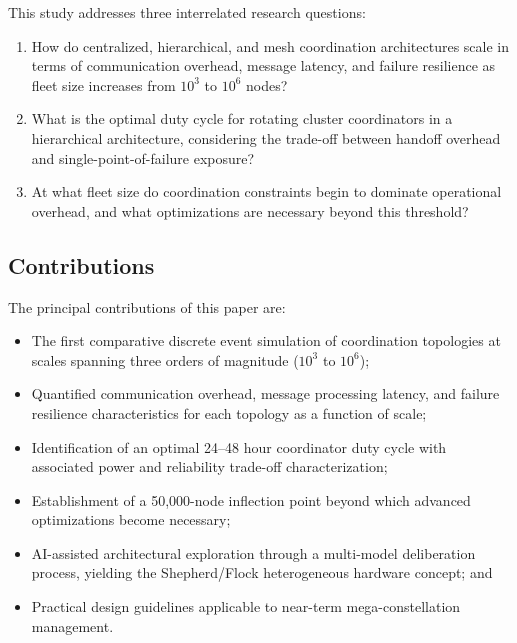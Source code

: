 \documentclass[journal]{IEEEtran}
\begin{document}
This study addresses three interrelated research questions:

\begin{enumerate}
    \item[\textbf{RQ1:}] How do centralized, hierarchical, and mesh coordination architectures scale in terms of communication overhead, message latency, and failure resilience as fleet size increases from $10^3$ to $10^6$ nodes?
    \item[\textbf{RQ2:}] What is the optimal duty cycle for rotating cluster coordinators in a hierarchical architecture, considering the trade-off between handoff overhead and single-point-of-failure exposure?
    \item[\textbf{RQ3:}] At what fleet size do coordination constraints begin to dominate operational overhead, and what optimizations are necessary beyond this threshold?
\end{enumerate}

\subsection{Contributions}

The principal contributions of this paper are:
\begin{itemize}
    \item The first comparative discrete event simulation of coordination topologies at scales spanning three orders of magnitude ($10^3$ to $10^6$);
    \item Quantified communication overhead, message processing latency, and failure resilience characteristics for each topology as a function of scale;
    \item Identification of an optimal 24--48 hour coordinator duty cycle with associated power and reliability trade-off characterization;
    \item Establishment of a 50{,}000-node inflection point beyond which advanced optimizations become necessary;
    \item AI-assisted architectural exploration through a multi-model deliberation process, yielding the Shepherd/Flock heterogeneous hardware concept; and
    \item Practical design guidelines applicable to near-term mega-constellation management.
\end{itemize}


\end{document}

